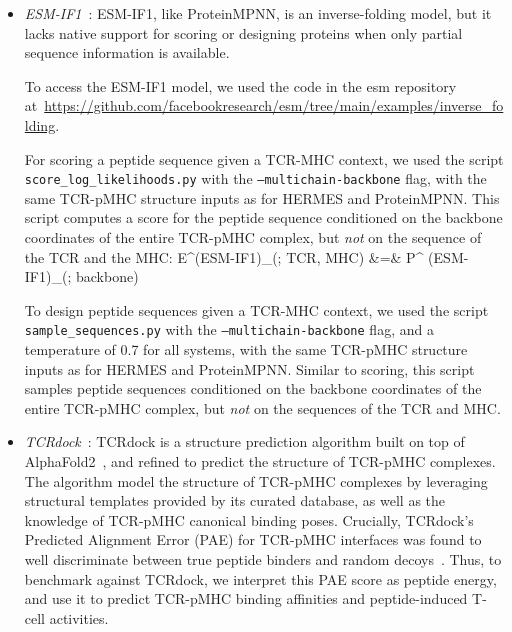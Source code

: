 \begin{itemize}
Similar to HERMES, we considered ProteinMPNN models trained with two noise levels: 0.02~\AA~(very
little noise) and 0.20 \AA.

For designs with ProteinMPNN, we use the algorithm's native functionalities, keeping the TCR and MHC
structures fixed (from the design template) and prompting the model to design only the peptide. We
use two ProteinMPNN models (trained with 0.02~\AA~and 0.20~\AA~noise), and use a temperature of 0.7
for all systems. \\


\item {\em ESM-IF1}~\cite{Hsu2022-km}: ESM-IF1, like ProteinMPNN, is an inverse-folding model, but
it lacks native support for scoring or designing proteins when only partial sequence information is
available.

To access the ESM-IF1 model, we used the code in the esm repository
at~\url{https://github.com/facebookresearch/esm/tree/main/examples/inverse_folding}.

For scoring a peptide sequence given a TCR-MHC context, we used the script
\texttt{score\_log\_likelihoods.py} with the \texttt{--multichain-backbone} flag, with the same
TCR-pMHC structure inputs as for HERMES and ProteinMPNN. This script computes a score for the
peptide sequence conditioned on the backbone coordinates of the entire TCR-pMHC complex, but {\em
not} on the sequence of the TCR and the MHC:
\EQA
\nonumber E^{\rm (ESM-IF1)}_{}(\sigma; TCR, MHC) &=& \log P^{\rm
(ESM-IF1)}_{}(\sigma ; {\rm backbone})
\label{eq:peplogp_esmif}
\EEA

To design peptide sequences given a TCR-MHC context, we used the script
\texttt{sample\_sequences.py} with the \texttt{--multichain-backbone} flag, and a temperature of 0.7
for all systems, with the same TCR-pMHC structure inputs as for HERMES and ProteinMPNN. Similar to
scoring, this script samples peptide sequences conditioned on the backbone coordinates of the entire
TCR-pMHC complex, but {\em not} on the sequences of the TCR and MHC.\\


\item {\em TCRdock}~\cite{Bradley2023-rl}: TCRdock is a structure prediction algorithm built on top
of AlphaFold2~\cite{Jumper2021-hl}, and refined to predict the structure of TCR-pMHC complexes. The
algorithm model the structure of TCR-pMHC complexes by leveraging structural templates provided by
its curated database, as well as the knowledge of TCR-pMHC canonical binding poses. Crucially,
TCRdock's Predicted Alignment Error (PAE) for TCR-pMHC interfaces was found to well discriminate
between true peptide binders and random decoys~\cite{Bradley2023-rl}. Thus, to benchmark against
TCRdock, we interpret this PAE score as peptide energy, and use it to predict TCR-pMHC binding
affinities and peptide-induced T-cell activities.


\end{itemize}
